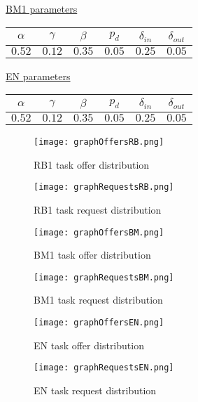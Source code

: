 \documentclass[main.tex]{subfiles}
\begin{document}
\begin{center}
  \underline{BM1 parameters}

  \begin{tabular}{| c | c | c | c | c | c | }
    \hline
    $\alpha$ & $\gamma$ & $\beta$ & $p_d$ & $\delta_{in}$ & $\delta_{out}$ \\ \hline
    $0.52$ & $0.12$ & $0.35$ & $0.05$ & $0.25$ & $0.05$ \\
    \hline
  \end{tabular}
\end{center}

\begin{center}
  \underline{EN parameters}

  \begin{tabular}{| c | c | c | c | c | c | }
    \hline
    $\alpha$ & $\gamma$ & $\beta$ & $p_d$ & $\delta_{in}$ & $\delta_{out}$ \\ \hline
    $0.52$ & $0.12$ & $0.35$ & $0.05$ & $0.25$ & $0.05$ \\
    \hline
  \end{tabular}
\end{center}

\begin{figure}[H]
  \centering
  \begin{minipage}[b]{0.45\textwidth}
    \texttt{[image: graphOffersRB.png]}
    \caption{RB1 task offer distribution}
  \end{minipage}
  \hfill
  \begin{minipage}[b]{0.45\textwidth}
    \texttt{[image: graphRequestsRB.png]}
    \caption{RB1 task request distribution}
  \end{minipage}
  \label{fig:RB1}
\end{figure}

\begin{figure}[H]
  \centering
  \begin{minipage}[b]{0.45\textwidth}
    \texttt{[image: graphOffersBM.png]}
    \caption{BM1 task offer distribution}
  \end{minipage}
  \hfill
  \begin{minipage}[b]{0.45\textwidth}
    \texttt{[image: graphRequestsBM.png]}
    \caption{BM1 task request distribution}
  \end{minipage}
\end{figure}

\begin{figure}[H]
  \centering
  \begin{minipage}[b]{0.45\textwidth}
    \texttt{[image: graphOffersEN.png]}
    \caption{EN task offer distribution}
  \end{minipage}
  \hfill
  \begin{minipage}[b]{0.45\textwidth}
    \texttt{[image: graphRequestsEN.png]}
    \caption{EN task request distribution}
  \end{minipage}
\end{figure}
\end{document}
